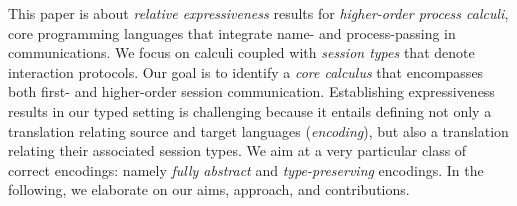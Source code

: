 
This paper is about \emph{relative expressiveness} results for 
\emph{higher-order process calculi}, core programming languages that 
integrate name- and process-passing in communications.
We focus on calculi coupled with \emph{session types} that denote interaction protocols. 
Our goal is to identify
a \emph{core %
calculus}
that encompasses both first- and higher-order session communication.
Establishing expressiveness results 
in our typed setting 
is challenging because 
 it entails defining 
 not only a translation 
relating source and target languages (\emph{encoding}), but also a translation 
relating their associated session types. 
We aim at a very particular class of correct encodings: namely \emph{fully abstract} and \emph{type-preserving} encodings.
In the following, we elaborate on our aims,   approach, and contributions.

